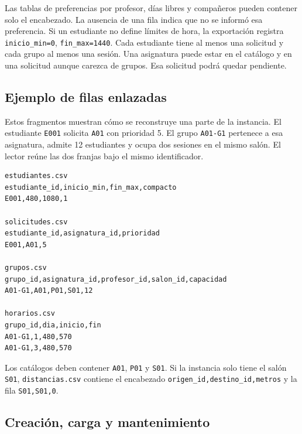 \documentclass[11pt]{article}
\numberwithin{equation}{section}
\numberwithin{figure}{section}
\numberwithin{table}{section}
\theoremstyle{definition}
\begin{document}
Las tablas de preferencias por profesor, días libres y compañeros pueden
contener solo el encabezado. La ausencia de una fila indica que no se
informó esa preferencia. Si un estudiante no define límites de hora, la
exportación registra \texttt{inicio\_min=0}, \texttt{fin\_max=1440}.
Cada estudiante tiene al menos una solicitud y cada grupo al menos una
sesión. Una asignatura puede estar en el catálogo y en una solicitud aunque
carezca de grupos. Esa solicitud podrá quedar pendiente.

\subsection{Ejemplo de filas enlazadas}

Estos fragmentos muestran cómo se reconstruye una parte de la instancia.
El estudiante \texttt{E001} solicita \texttt{A01} con prioridad 5.
El grupo \texttt{A01-G1} pertenece a esa asignatura, admite 12 estudiantes y
ocupa dos sesiones en el mismo salón. El lector reúne las dos franjas bajo
el mismo identificador.

\begin{verbatim}
estudiantes.csv
estudiante_id,inicio_min,fin_max,compacto
E001,480,1080,1

solicitudes.csv
estudiante_id,asignatura_id,prioridad
E001,A01,5

grupos.csv
grupo_id,asignatura_id,profesor_id,salon_id,capacidad
A01-G1,A01,P01,S01,12

horarios.csv
grupo_id,dia,inicio,fin
A01-G1,1,480,570
A01-G1,3,480,570
\end{verbatim}

Los catálogos deben contener \texttt{A01}, \texttt{P01} y \texttt{S01}.
Si la instancia solo tiene el salón \texttt{S01}, \texttt{distancias.csv}
contiene el encabezado \texttt{origen\_id,destino\_id,metros} y la fila
\texttt{S01,S01,0}.

\subsection{Creación, carga y mantenimiento}
\end{document}
